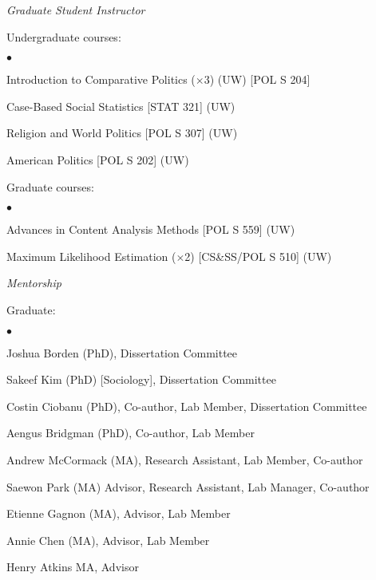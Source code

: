 \documentclass[margin,line]{res}
\newenvironment{list1}{
  \begin{list}{\ding{113}}{%
      \setlength{\itemsep}{0in}
      \setlength{\parsep}{0in} \setlength{\parskip}{0in}
      \setlength{\topsep}{0in} \setlength{\partopsep}{0in} 
      \setlength{\leftmargin}{0.17in}}}{\end{list}}
\newenvironment{list2}{
  \begin{list}{$\bullet$}{%
      \setlength{\itemsep}{0in}
      \setlength{\parsep}{0in} \setlength{\parskip}{0in}
      \setlength{\topsep}{0in} \setlength{\partopsep}{0in} 
      \setlength{\leftmargin}{0.2in}}}{\end{list}}
\begin{document}
{\begin{resume}
{\em Graduate Student Instructor } \\
\vspace{-.1in}
\begin{list1}
 \item[] Undergraduate courses:
   \begin{list2}
   \item[] Introduction to Comparative Politics ($\times$3) (UW)
   [POL S 204]
   \item[] Case-Based Social Statistics [STAT 321] (UW)
   \item[]Religion and World Politics [POL S 307] (UW)
     \item[] American Politics [POL S 202] (UW)
\end{list2}
\item[] Graduate courses:
   \begin{list2}
     \item [] Advances in Content Analysis Methods [POL S 559] (UW)
     \item [] Maximum Likelihood Estimation ($\times$2) [CS\&SS/POL S
       510] (UW)
\end{list2}
\end{list1}

\textbf{}
{\em Mentorship}\\
\vspace{-.1in}
\begin{list1}
\item[] Graduate:
  \begin{list2}
  \item[] Joshua Borden (PhD), Dissertation Committee
  \item[] Sakeef Kim (PhD) [Sociology], Dissertation Committee
  \item[] Costin Ciobanu (PhD), Co-author, Lab Member, Dissertation Committee
  \item[] Aengus Bridgman (PhD), Co-author, Lab Member
   \item[] Andrew McCormack (MA), Research Assistant, Lab Member, Co-author
   \item[] Saewon Park (MA) Advisor, Research Assistant, Lab Manager, Co-author
   \item[] Etienne Gagnon (MA),  Advisor, Lab Member
   \item[] Annie Chen (MA), Advisor, Lab Member
   \item[] Henry Atkins MA, Advisor
     
\end{list2}


\end{list1}
\end{resume}}
\end{document}
